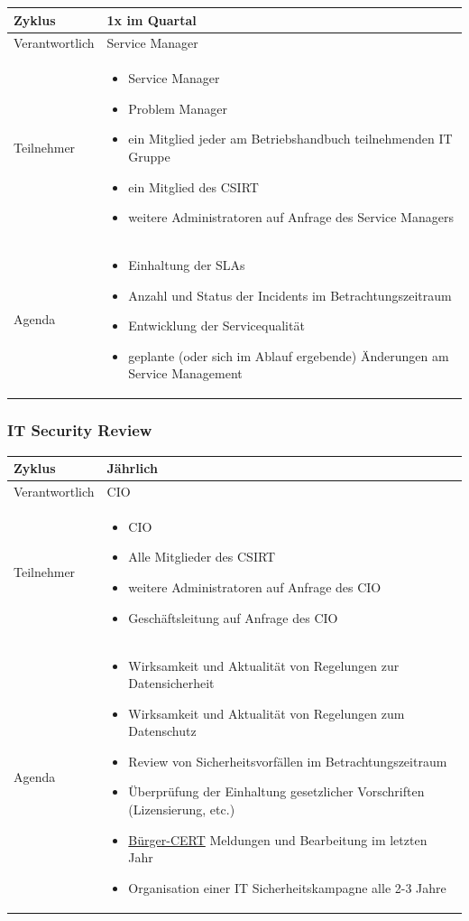 \documentclass[]{article}
\begin{document}
\begin{longtable}{lp{6cm}}
\toprule
Zyklus & 1x im Quartal\tabularnewline
\midrule
Verantwortlich & Service Manager\tabularnewline
Teilnehmer & \begin{itemize}
\item
  Service Manager
\item
  Problem Manager
\item
  ein Mitglied jeder am Betriebshandbuch teilnehmenden IT Gruppe
\item
  ein Mitglied des CSIRT
\item
  weitere Administratoren auf Anfrage des Service Managers
\end{itemize}\tabularnewline
Agenda & \begin{itemize}
\item
  Einhaltung der SLAs
\item
  Anzahl und Status der Incidents im Betrachtungszeitraum
\item
  Entwicklung der Servicequalität
\item
  geplante (oder sich im Ablauf ergebende) Änderungen am Service
  Management
\end{itemize}\tabularnewline
\bottomrule
\end{longtable}
\newpage
\subsubsection{IT Security Review}\label{it-security-review}

\begin{longtable}{lp{6cm}}
\toprule
Zyklus & Jährlich\tabularnewline
\midrule
Verantwortlich & CIO\tabularnewline
Teilnehmer & \begin{itemize}
\item
  CIO
\item
  Alle Mitglieder des CSIRT
\item
  weitere Administratoren auf Anfrage des CIO
\item
  Geschäftsleitung auf Anfrage des CIO
\end{itemize}\tabularnewline
Agenda & \begin{itemize}
\item
  Wirksamkeit und Aktualität von Regelungen zur Datensicherheit
\item
  Wirksamkeit und Aktualität von Regelungen zum Datenschutz
\item
  Review von Sicherheitsvorfällen im Betrachtungszeitraum
\item
  Überprüfung der Einhaltung gesetzlicher Vorschriften (Lizensierung,
  etc.)
\item
  \href{https://www.buerger-cert.de/archive?type=WIDTechnicalWarning}{Bürger-CERT}
  Meldungen und Bearbeitung im letzten Jahr
\item
  Organisation einer IT Sicherheitskampagne alle 2-3 Jahre
\end{itemize}\tabularnewline
\bottomrule
\end{longtable}
\end{document}
